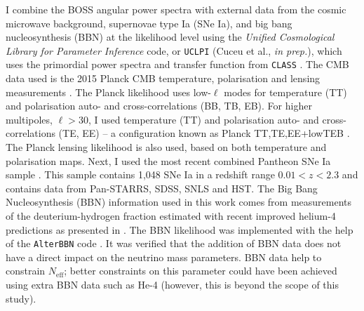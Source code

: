 \qquad I combine the BOSS angular power spectra with external data from the cosmic microwave background, supernovae type Ia (SNe Ia), and big bang nucleosynthesis (BBN) at the likelihood level using the \textit{Unified Cosmological Library for Parameter Inference} code, or \texttt{UCLPI} (Cuceu et al., \textit{in prep.}), which uses the primordial power spectra and transfer function from \texttt{CLASS} \citep{Class}. The CMB data used is the 2015 Planck CMB temperature, polarisation and lensing measurements \citep{PlanckLikelihood2015}. The Planck likelihood uses low-$\ell$ modes for temperature (TT) and polarisation auto- and cross-correlations (BB, TB, EB). For higher multipoles, $\ell > 30$, I used temperature (TT) and polarisation auto- and cross-correlations (TE, EE) -- a configuration known as Planck TT,TE,EE+lowTEB \citep{PlanckLikelihood2015,PlanckResults2015}. The Planck lensing likelihood is also used, based on both temperature and polarisation maps. Next, I used  the most recent combined Pantheon SNe Ia sample \citep{2018Pantheon}. This sample contains 1,048 SNe Ia in a redshift range $0.01 < z < 2.3$ and contains data from Pan-STARRS, SDSS, SNLS and HST. The Big Bang Nucleosynthesis (BBN) information used in this work comes from measurements of the deuterium-hydrogen fraction estimated with recent improved helium-4 predictions as presented in \cite{2018BBN-Measurements}. The BBN likelihood was implemented with the help of the \texttt{AlterBBN} code \citep{2018AlterBBN}.  It was verified that the addition of BBN data does not have a direct impact on the neutrino mass parameters. BBN data help to constrain $N_{\text{eff}}$; better constraints on this parameter could have been achieved using extra BBN data such as He-4 (however, this is beyond the scope of this study).



